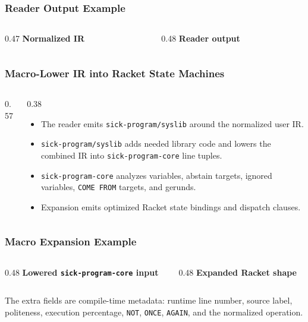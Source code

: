 \documentclass{beamer}
\begin{document}
\begin{frame}[fragile,shrink=8]
  \frametitle{Reader Output Example}

  \begin{columns}[T]
    \begin{column}{0.47\textwidth}
      \textbf{Normalized IR}
      
    \end{column}
    \begin{column}{0.48\textwidth}
      \textbf{Reader output}
      
    \end{column}
  \end{columns}
\end{frame}

\begin{frame}[fragile,shrink=15]
  \frametitle{Macro-Lower IR into Racket State Machines}

  \begin{columns}[T]
    \begin{column}{0.57\textwidth}
      
    \end{column}
    \begin{column}{0.38\textwidth}
      \begin{itemize}
        \item The reader emits \texttt{sick-program/syslib} around the normalized user IR.
        \item \texttt{sick-program/syslib} adds needed library code and lowers the combined IR into \texttt{sick-program-core} line tuples.
        \item \texttt{sick-program-core} analyzes variables, abstain targets, ignored variables, \texttt{COME FROM} targets, and gerunds.
        \item Expansion emits optimized Racket state bindings and dispatch clauses.
      \end{itemize}
    \end{column}
  \end{columns}
\end{frame}

\begin{frame}[fragile,shrink=12]
  \frametitle{Macro Expansion Example}

  \begin{columns}[T]
    \begin{column}{0.48\textwidth}
      \textbf{Lowered \texttt{sick-program-core} input}
      
    \end{column}
    \begin{column}{0.48\textwidth}
      \textbf{Expanded Racket shape}
      
    \end{column}
  \end{columns}

  \vspace{0.15cm}
  \scriptsize
  The extra fields are compile-time metadata: runtime line number, source label,
  politeness, execution percentage, \texttt{NOT}, \texttt{ONCE}, \texttt{AGAIN},
  and the normalized operation.
\end{frame}
\end{document}
